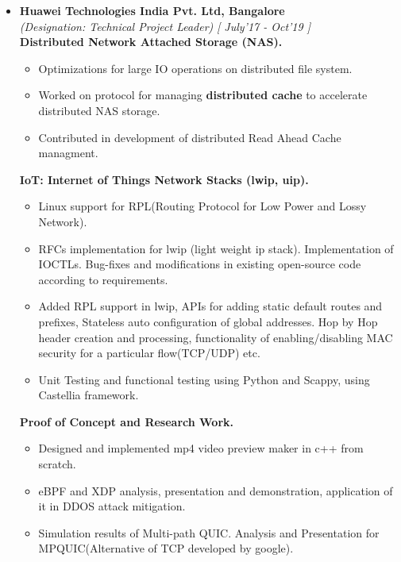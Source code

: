 \documentclass[a4paper,10pt]{article}
\begin{document}
\vspace{-0.25cm}
\vspace{-0.2cm}
\begin{itemize}
\item \textbf{Huawei Technologies India Pvt. Ltd, Bangalore} \\
\emph{(Designation: Technical Project Leader)} \hfill {\emph{[ July'17 - Oct'19 ]}}  \\
\textbf{Distributed Network Attached Storage (NAS).}\\[-0.6cm]
\begin{itemize}
	\item Optimizations for large IO operations on distributed file system.\\[-0.5cm]
	\item Worked on protocol for managing \textbf{distributed cache} to accelerate distributed NAS storage.\\[-0.5cm]
	\item Contributed in development of distributed Read Ahead Cache managment.
\end{itemize}
\textbf{IoT: Internet of Things Network Stacks (lwip, uip).}\\[-0.6cm]
\begin{itemize} 
	\item Linux support for RPL(Routing Protocol for Low Power and Lossy Network).\\[-0.5cm]
	\item RFCs implementation for lwip (light weight ip stack). Implementation of IOCTLs. Bug-fixes and modifications in existing open-source code according to requirements.\\[-0.5cm]
	\item Added RPL support in lwip, APIs for adding static default routes and prefixes, Stateless auto configuration of global addresses. Hop by Hop header creation and processing, functionality of enabling/disabling MAC security for a particular flow(TCP/UDP) etc.\\[-0.5cm]
	\item Unit Testing and functional testing using Python and Scappy, using Castellia framework.\\[-0.5cm]
\end{itemize}
\textbf{Proof of Concept and Research Work.}\\[-0.6cm]
\begin{itemize}  	
	\item Designed and implemented mp4 video preview maker in c++ from scratch. \\[-0.5cm]
	\item eBPF and XDP analysis, presentation and demonstration, application of it in DDOS attack mitigation.\\[-0.5cm] 
	\item Simulation results of Multi-path QUIC. Analysis and Presentation for MPQUIC(Alternative of TCP developed by google).\\[-0.5cm]
\end{itemize}
\end{itemize}
\end{document}
